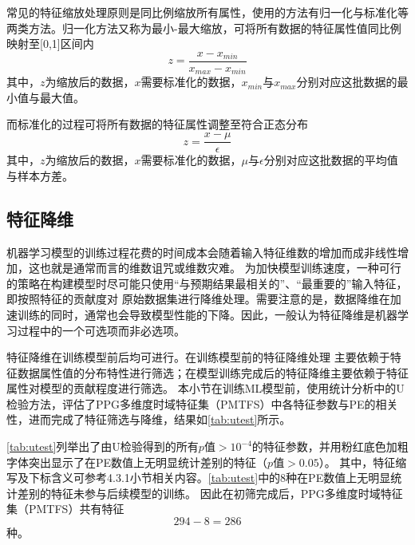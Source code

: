 常见的特征缩放处理原则是同比例缩放所有属性，使用的方法有归一化与标准化等两类方法。归一化方法又称为最小-最大缩放，可将所有数据的特征属性值同比例映射至[0,1]区间内
\begin{equation}
    \label{equ:maxmin}
    z = \frac{x - x_{min}}{x_{max}-x_{min}}
\end{equation}
其中，$z$为缩放后的数据，$x$需要标准化的数据，$x_{min}$与$x_{max}$分别对应这批数据的最小值与最大值。

而标准化的过程可将所有数据的特征属性调整至符合正态分布
\begin{equation}
    \label{equ:normalization}
    z = \frac{x - \mu}{\epsilon}
\end{equation}
其中，$z$为缩放后的数据，$x$需要标准化的数据，$\mu$与$\epsilon$分别对应这批数据的平均值与样本方差。

\subsection{特征降维}
机器学习模型的训练过程花费的时间成本会随着输入特征维数的增加而成非线性增加，这也就是通常而言的维数诅咒或维数灾难。
为加快模型训练速度，一种可行的策略在构建模型时尽可能只使用“与预期结果最相关的”、“最重要的”输入特征，即按照特征的贡献度对
原始数据集进行降维处理。需要注意的是，数据降维在加速训练的同时，通常也会导致模型性能的下降。因此，一般认为特征降维是机器学习过程中的一个可选项而非必选项。

特征降维在训练模型前后均可进行。在训练模型前的特征降维处理
主要依赖于特征数据属性值的分布特性进行筛选；在模型训练完成后的特征降维主要依赖于特征属性对模型的贡献程度进行筛选。
本小节在训练ML模型前，使用统计分析中的U检验方法，评估了PPG多维度时域特征集（PMTFS）中各特征参数与PE的相关性，进而完成了特征筛选与降维，结果如\autoref{tab:utest}所示。

\autoref{tab:utest}列举出了由U检验得到的所有$p$值$>10^{-4}$的特征参数，并用粉红底色加粗字体突出显示了在PE数值上无明显统计差别的特征（$p$值$> 0.05$）。
其中，特征缩写及下标含义可参考4.3.1小节相关内容。\autoref{tab:utest}中的8种在PE数值上无明显统计差别的特征未参与后续模型的训练。
因此在初筛完成后，PPG多维度时域特征集（PMTFS）共有特征
\begin{equation}
    \label{equ:fn2}
    294-8=286
\end{equation}
种。

